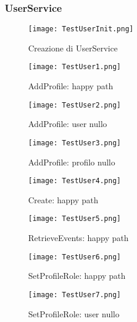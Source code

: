 \subsubsection{UserService}
\begin{figure}[h!]
    \begin{center}
        \texttt{[image: TestUserInit.png]}
        \caption{Creazione di UserService}
    \end{center}
\end{figure}
\begin{figure}[h!]
    \begin{center}
        \texttt{[image: TestUser1.png]}
        \caption{AddProfile: happy path}
    \end{center}
\end{figure}
\begin{figure}[h!]
    \begin{center}
        \texttt{[image: TestUser2.png]}
        \caption{AddProfile: user nullo}
    \end{center}
\end{figure}
\begin{figure}[h!]
    \begin{center}
        \texttt{[image: TestUser3.png]}
        \caption{AddProfile: profilo nullo}
    \end{center}
\end{figure}
\begin{figure}[h!]
    \begin{center}
        \texttt{[image: TestUser4.png]}
        \caption{Create: happy path}
    \end{center}
\end{figure}
\begin{figure}[h!]
    \begin{center}
        \texttt{[image: TestUser5.png]}
        \caption{RetrieveEvents: happy path}
    \end{center}
\end{figure}
\begin{figure}[h!]
    \begin{center}
        \texttt{[image: TestUser6.png]}
        \caption{SetProfileRole: happy path}
    \end{center}
\end{figure}
\begin{figure}[h!]
    \begin{center}
        \texttt{[image: TestUser7.png]}
        \caption{SetProfileRole: user nullo}
    \end{center}
\end{figure}
